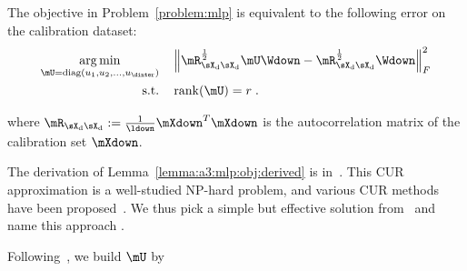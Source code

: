 \begin{lemma}
    \label{lemma:a3:mlp:obj:derived}
    The objective in Problem~\ref{problem:mlp} is equivalent to the following error on the calibration dataset:
    \begin{equation}
    \begin{aligned}
    \underset{\mU = \operatorname{diag}(u_1, u_2, \dots, u_{\dinter})}{\arg\min}
    \quad
    & \left\|
    \mR_{\sX_{\text{d}}\sX_{\text{d}}}^{\frac{1}{2}}
    \mU \Wdown
    -
    \mR_{\sX_{\text{d}}\sX_{\text{d}}}^{\frac{1}{2}}
    \Wdown
    \right\|_F^2 \\
    \text{s.t.} \quad
    & \operatorname{rank}(\mU) = r \; .
    \end{aligned}
    \end{equation}
    

    where $\mR_{\sX_{\text{d}}\sX_{\text{d}}} := \frac{1}{\ldown}\mXdown^T \mXdown$ is the autocorrelation matrix of the calibration set $\mXdown$.
\end{lemma}
The derivation of Lemma~\ref{lemma:a3:mlp:obj:derived} is in~. This CUR approximation is a well-studied NP-hard problem, and various CUR methods have been proposed~\citep{optimal-cur-matrix-decompositions, Fast-Monte-Carlo-Algorithms-for-Matrices-I:-Approximating-Matrix-Multiplication}.
We thus pick a simple but effective solution from~\cite{Fast-Monte-Carlo-Algorithms-for-Matrices-I:-Approximating-Matrix-Multiplication} and name this approach \mymethodmlp{}.

Following~\cite{Fast-Monte-Carlo-Algorithms-for-Matrices-I:-Approximating-Matrix-Multiplication}, we build $\mU$ by
